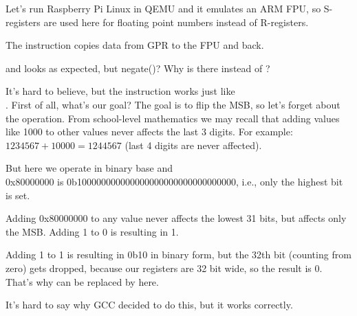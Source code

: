 


Let's run Raspberry Pi Linux in QEMU and it emulates an ARM FPU, so S-registers are used here for floating point
numbers instead of R-registers.


The \FMRS instruction copies data from \ac{GPR} to the FPU and back.

 and  looks as expected, but negate()?
Why is there \ADD instead of \XOR?

It's hard to believe, but the instruction 
 works just like \\
.
First of all, what's our goal?
The goal is to flip the \ac{MSB}, so let's forget about the \XOR operation.
From school-level mathematics we may recall that adding values like 1000 to other values never affects
the last 3 digits.
For example: $1234567 + 10000 = 1244567$ (last 4 digits are never affected).

But here we operate in binary base and\\
0x80000000 is 0b100000000000000000000000000000000, i.e., only the highest bit is set.

Adding 0x80000000 to any value never affects the lowest 31 bits, but affects only the \ac{MSB}.
Adding 1 to 0 is resulting in 1.

Adding 1 to 1 is resulting in 0b10 in binary form, but the 32th bit (counting from zero) gets dropped, 
because our registers are 32 bit wide, so the result is 0.
That's why \XOR can be replaced by \ADD here.

It's hard to say why GCC decided to do this, but it works correctly.
